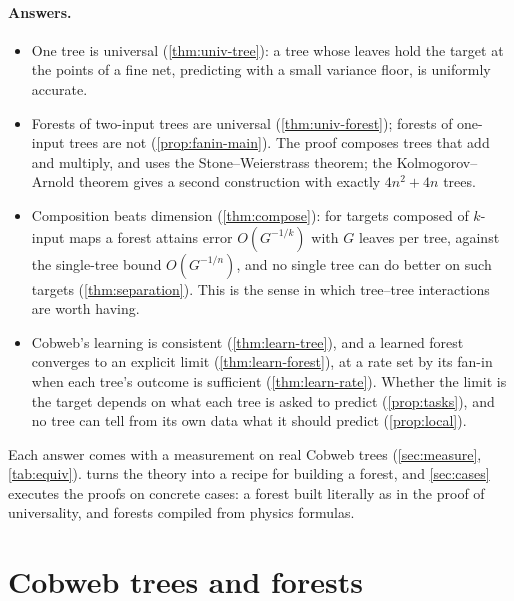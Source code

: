 \paragraph{Answers.}
\begin{itemize}[leftmargin=*,noitemsep]
\item One tree is universal (\cref{thm:univ-tree}): a tree whose leaves hold the target at
  the points of a fine net, predicting with a small variance floor, is uniformly accurate.
\item Forests of two-input trees are universal (\cref{thm:univ-forest}); forests of
  one-input trees are not (\cref{prop:fanin-main}).  The proof composes trees that add and
  multiply, and uses the Stone--Weierstrass theorem; the Kolmogorov--Arnold theorem gives a
  second construction with exactly $4n^2+4n$ trees.
\item Composition beats dimension (\cref{thm:compose}): for targets composed of $k$-input
  maps a forest attains error $O(G^{-1/k})$ with $G$ leaves per tree, against the single-tree
  bound $O(G^{-1/n})$, and no single tree can do better on such targets
  (\cref{thm:separation}).  This is the sense in which tree--tree interactions are worth
  having.
\item Cobweb's learning is consistent (\cref{thm:learn-tree}), and a learned forest
  converges to an explicit limit (\cref{thm:learn-forest}), at a rate set by its fan-in when
  each tree's outcome is sufficient (\cref{thm:learn-rate}).  Whether the limit is the target
  depends on what each tree is asked to predict (\cref{prop:tasks}), and no tree can tell from
  its own data what it should predict (\cref{prop:local}).
\end{itemize}
Each answer comes with a measurement on real Cobweb trees (\cref{sec:measure},
\cref{tab:equiv}).   turns the theory into a recipe for building a forest,
and \cref{sec:cases} executes the proofs on concrete cases: a forest built literally as in
the proof of universality, and forests compiled from physics formulas.

\section{Cobweb trees and forests}\label{sec:forests}


